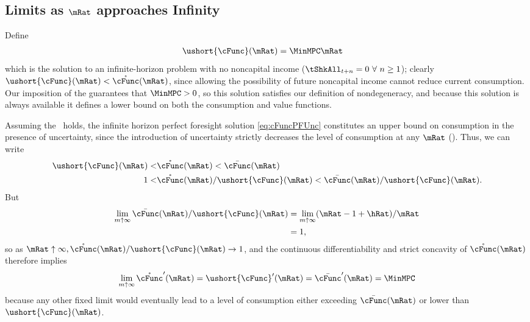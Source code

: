 \documentclass[BufferStockTheory]{subfiles}
\begin{document}
\renewcommand{\figFile}{cGroTargetFig}
\hypertarget{\figFile}{}


\hypertarget{LimitsAsmtToInfty}{}
\subsection{Limits as $\mRat$ approaches Infinity}

\label{subsec:LimitsAsmtToInfty}

Define
\begin{align*}
  \ushort{\cFunc}(\mRat)  & = \MinMPC \mRat
\end{align*}
which is the solution to an infinite-horizon problem with no noncapital income ($\tShkAll_{t+n} = 0~\forall~n\geq1$); clearly $\ushort{\cFunc}(\mRat) < \mathring{\cFunc}(\mRat)$, since allowing the possibility of future noncapital income cannot reduce current consumption.  Our imposition of the {\RIC} guarantees that $\MinMPC > 0$, so this solution satisfies our definition of nondegeneracy, and because this solution is always available it defines a lower bound on both the consumption and value functions.%

Assuming the \FHWC~holds, the infinite horizon perfect foresight solution \eqref{eq:cFuncPFUnc} constitutes an upper bound on consumption in the presence of uncertainty, since the introduction of uncertainty strictly decreases the level of consumption at any $\mRat$ (\cite{ckConcavity}).  Thus, we can write
\begin{align}  
  \ushort{\cFunc}(\mRat) < & \mathring{\cFunc}(\mRat)  < \bar{\cFunc}(\mRat) \label{eq:lowerltupper} \\
  1 < & \mathring{\cFunc}(\mRat)/\ushort{\cFunc}(\mRat)  < \bar{\cFunc}(\mRat)/\ushort{\cFunc}(\mRat). \nonumber
\end{align}
But
\begin{align*}  \label{eq:limitlowerupper}
  \lim_{m \uparrow \infty} \bar{\cFunc}(\mRat)/\ushort{\cFunc}(\mRat) 
  & = \lim_{m \uparrow \infty} (\mRat -1+ \hRat)/\mRat  \\
  & = 1, 
\end{align*}
so as $\mRat \uparrow \infty, \mathring{\cFunc}(\mRat)/\ushort{\cFunc}(\mRat)
\rightarrow 1$, and the continuous differentiability and strict
concavity of $\mathring{\cFunc}(\mRat)$ therefore implies
\begin{equation*}  \label{eq:limxtoinftycp}
  \lim_{m \uparrow \infty} \mathring{\cFunc}^{\prime}(\mRat) =
  \ushort{\cFunc}^{\prime}(\mRat) = \bar{\cFunc}^{\prime}(\mRat) = \MinMPC 
\end{equation*}
because any other fixed limit would eventually lead to a level of
consumption either exceeding $\bar{\cFunc}(\mRat)$ or lower than
$\ushort{\cFunc}(\mRat)$.
\end{document}
